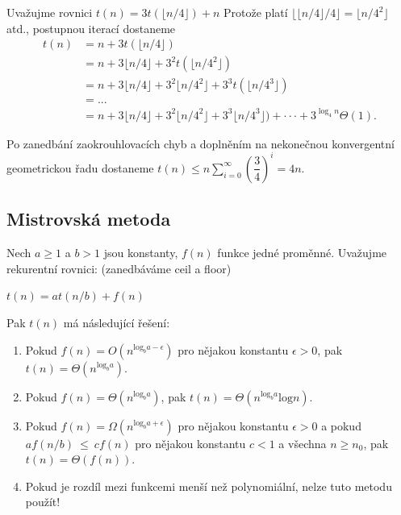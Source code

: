 \documentclass{szzclass}
\begin{document}
Uvažujme rovnici
$t(n) = 3t(\lfloor n/4\rfloor) + n$
Protože platí $\lfloor \lfloor n/4\rfloor /4\rfloor = \lfloor n/4^2 \rfloor$
atd., postupnou iterací dostaneme
\begin{align*}
t(n) &= n + 3t(\lfloor n/4 \rfloor)\\
     &= n + 3 \lfloor n/4\rfloor + 3^2t(\lfloor n/4^2 \rfloor)\\
     &= n + 3 \lfloor n/4 \rfloor + 3^2\lfloor n/4^2 \rfloor + 3^3t(\lfloor n/4^3 \rfloor)\\
     &= . . .\\
     &= n + 3 \lfloor n/4\rfloor + 3^2 \lfloor n/4^2 \rfloor + 3^3 \lfloor n/4^3 \rfloor) + · · · + 3^{\log_4 n} \Theta(1).
\end{align*}

Po zanedbání zaokrouhlovacích chyb a doplněním na nekonečnou
konvergentní geometrickou řadu dostaneme
$t(n) \leq n \sum\limits_{i=0}^{\infty}(\dfrac{3}{4})^i= 4n$.






\subsection{Mistrovská metoda}

Nech $a \geq 1$ a $b > 1$ jsou konstanty, $f(n)$ funkce jedné proměnné.
Uvažujme rekurentní rovnici: (zanedbáváme ceil a floor)
\begin{center}
    $t(n) = at(n/b) + f(n)$ 
\end{center}

Pak $t(n)$ má následující řešení:
\begin{enumerate}
    \item Pokud $f(n) = O(n^{\text{log}_b a - \epsilon} )$ pro nějakou konstantu $\epsilon > 0$, pak $t(n) = \Theta (n^{\text{log}_b a})$.
    \item Pokud $f(n) = \Theta (n^{\text{log}_b a})$, pak $t(n) = \Theta (n^{\text{log}_b a} \text{log} n)$.
    \item Pokud $f(n) = \Omega (n^{\text{log}_b a + \epsilon} )$ pro nějakou konstantu $\epsilon > 0$ a pokud
    $af(n/b)~\leq~cf(n)$ pro nějakou konstantu $c < 1$ a všechna $n \geq n_0$, pak $t(n) = \Theta (f(n))$.
    \item Pokud je rozdíl mezi funkcemi menší než polynomiální, nelze tuto metodu použít!
\end{enumerate}
\end{document}
